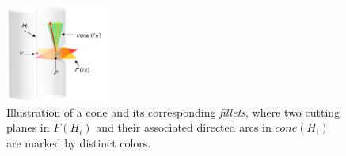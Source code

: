 









\begin{figure}[b]
  \centering
  \includegraphics[width=0.3\textwidth]{figs/cone-fillet.png}
  \caption{\label{fig:fillets}%
           Illustration of a cone and its corresponding \emph{fillets}, where two cutting planes in $F(H_i)$ and their associated directed arcs in $cone(H_i)$ are marked by distinct colors.}
\end{figure}


